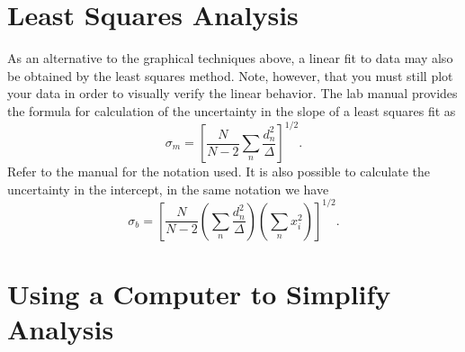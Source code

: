 \section{Least Squares Analysis}
	
As an alternative to the graphical techniques above,  a linear fit to data may 
also be obtained by the least squares method.  Note, however, that you must 
still plot your data in order to visually verify the linear behavior.  The lab 
manual provides the formula for calculation of the uncertainty in the slope of 
a least squares fit as
\[ \sigma_{m} = \left[ \frac{N}{N-2} \sum_{n} \frac{d_{n}^{2}}{\Delta}
\right]^{1/2}. \]
Refer to the manual for the notation used.  It is also possible to calculate
the uncertainty in the intercept,  in the same notation we have
\[ \sigma_{b} = \left[ \frac{N}{N-2} 
\left(\sum_{n} \frac{d_{n}^{2}}{\Delta} \right) 
\left(\sum_{n} x_{i}^{2}\right) \right]^{1/2}. \]

\section{Using a Computer to Simplify Analysis}

